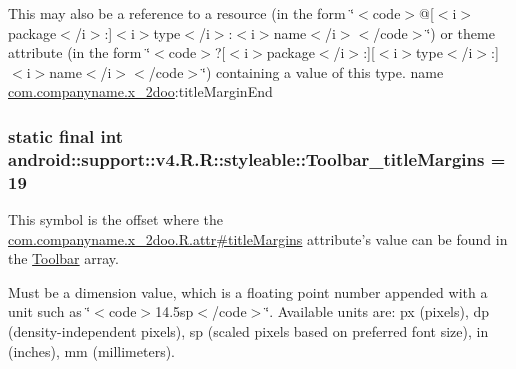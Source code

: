 This may also be a reference to a resource (in the form \char`\"{}$<$code$>$@\mbox{[}$<$i$>$package$<$/i$>$:\mbox{]}$<$i$>$type$<$/i$>$:$<$i$>$name$<$/i$>$$<$/code$>$\char`\"{}) or theme attribute (in the form \char`\"{}$<$code$>$?\mbox{[}$<$i$>$package$<$/i$>$:\mbox{]}\mbox{[}$<$i$>$type$<$/i$>$:\mbox{]}$<$i$>$name$<$/i$>$$<$/code$>$\char`\"{}) containing a value of this type.  name \hyperlink{namespacecom_1_1companyname_1_1x__2doo}{com.companyname.x\_\-2doo}:titleMarginEnd \hypertarget{classandroid_1_1support_1_1v4_1_1_r_1_1styleable_4cf3f31b90bbd9298763173e8ae75087}{
\subsubsection[{Toolbar\_\-titleMargins}]{\setlength{\rightskip}{0pt plus 5cm}static final int android::support::v4.R.R::styleable::Toolbar\_\-titleMargins = 19}}
\label{classandroid_1_1support_1_1v4_1_1_r_1_1styleable_4cf3f31b90bbd9298763173e8ae75087}


This symbol is the offset where the \hyperlink{classcom_1_1companyname_1_1x__2doo_1_1_r_1_1attr_13a8e062a2cd0a3ea42fe3376622f46d}{com.companyname.x\_\-2doo.R.attr\#titleMargins} attribute's value can be found in the \hyperlink{classandroid_1_1support_1_1v4_1_1_r_1_1styleable_0646d71cfbd4a8645c7d805b33e1c574}{Toolbar} array.

Must be a dimension value, which is a floating point number appended with a unit such as \char`\"{}$<$code$>$14.5sp$<$/code$>$\char`\"{}. Available units are: px (pixels), dp (density-independent pixels), sp (scaled pixels based on preferred font size), in (inches), mm (millimeters). 

